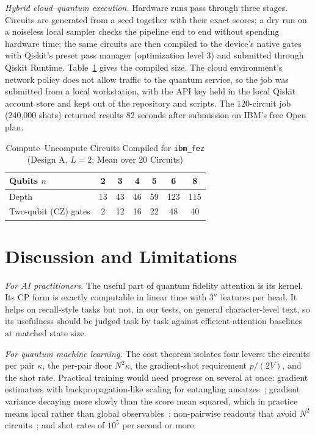 \documentclass[conference]{IEEEtran}
\theoremstyle{definition}
\begin{document}
\textit{Hybrid cloud--quantum execution.} Hardware runs pass through three stages. Circuits are generated from a seed together with their exact scores; a dry run on a noiseless local sampler checks the pipeline end to end without spending hardware time; the same circuits are then compiled to the device's native gates with Qiskit's preset pass manager (optimization level 3) and submitted through Qiskit Runtime. Table~\ref{tab:compile} gives the compiled size. The cloud environment's network policy does not allow traffic to the quantum service, so the job was submitted from a local workstation, with the API key held in the local Qiskit account store and kept out of the repository and scripts. The 120-circuit job (240{,}000 shots) returned results 82 seconds after submission on IBM's free Open plan.

\begin{table}[t]
\caption{Compute--Uncompute Circuits Compiled for \texttt{ibm\_fez} (Design A, $L=2$; Mean over 20 Circuits)}
\label{tab:compile}
\centering
\setlength{\tabcolsep}{5pt}
\begin{tabular}{@{}lcccccc@{}}
\toprule
Qubits $n$ & 2 & 3 & 4 & 5 & 6 & 8 \\
\midrule
Depth & 13 & 43 & 46 & 59 & 123 & 115 \\
Two-qubit (CZ) gates & 2 & 12 & 16 & 22 & 48 & 40 \\
\bottomrule
\end{tabular}
\end{table}

\section{Discussion and Limitations}

\textit{For AI practitioners.} The useful part of quantum fidelity attention is its kernel. Its CP form is exactly computable in linear time with $3^n$ features per head. It helps on recall-style tasks but not, in our tests, on general character-level text, so its usefulness should be judged task by task against efficient-attention baselines at matched state size.

\textit{For quantum machine learning.} The cost theorem isolates four levers: the circuits per pair $\kappa$, the per-pair floor $N^2\kappa$, the gradient-shot requirement $p/(2V)$, and the shot rate. Practical training would need progress on several at once: gradient estimators with backpropagation-like scaling for entangling ansatzes~\cite{bowles2025backprop}; gradient variance decaying more slowly than the score mean squared, which in practice means local rather than global observables~\cite{cerezo2021cost}; non-pairwise readouts that avoid $N^2$ circuits~\cite{pecilli2026overlap}; and shot rates of $10^5$ per second or more.
\end{document}
